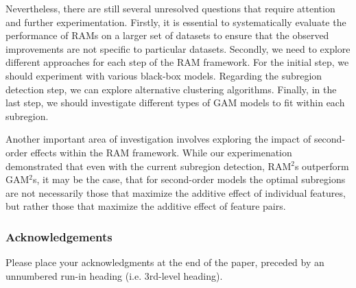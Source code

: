 \documentclass[runningheads]{llncs}
\begin{document}
Nevertheless, there are still several unresolved questions that require attention and further experimentation.
Firstly, it is essential to systematically evaluate the performance of RAMs on a larger set of datasets to ensure that the observed improvements are not specific to particular datasets.
Secondly, we need to explore different approaches for each step of the RAM framework.
For the initial step, we should experiment with various black-box models.
Regarding the subregion detection step, we can explore alternative clustering algorithms.
Finally, in the last step, we should investigate different types of GAM models to fit within each subregion.

Another important area of investigation involves exploring the impact of second-order effects within the RAM framework.
While our experimenation demonstrated that even with the current subregion detection, RAM$^2$s outperform GAM$^2$s,
it may be the case, that for second-order models the optimal subregions are not necessarily those that maximize the additive effect of individual features,
but rather those that maximize the additive effect of feature pairs.

\subsubsection{Acknowledgements} Please place your acknowledgments at
the end of the paper, preceded by an unnumbered run-in heading (i.e.
3rd-level heading).


\end{document}

